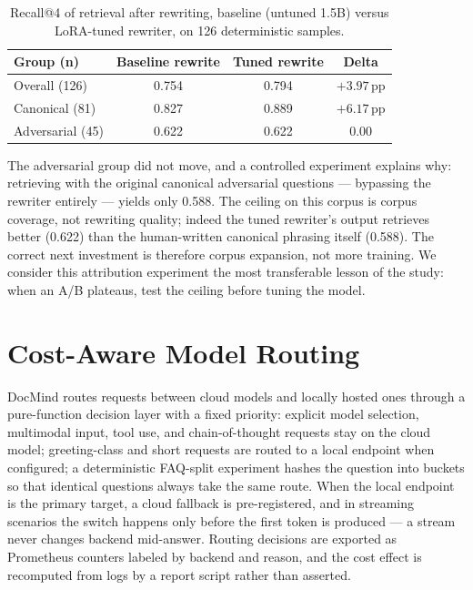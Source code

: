 \documentclass[11pt,a4paper]{article}
\begin{document}
\begin{table}[t]
  \centering
  \caption{Recall@4 of retrieval after rewriting, baseline (untuned 1.5B) versus
  LoRA-tuned rewriter, on 126 deterministic samples.}
  \label{tab:lora}
  \begin{tabular}{lccc}
    \toprule
    Group (n) & Baseline rewrite & Tuned rewrite & Delta \\
    \midrule
    Overall (126)    & 0.754 & 0.794 & $+3.97$\,pp \\
    Canonical (81)   & 0.827 & 0.889 & $+6.17$\,pp \\
    Adversarial (45) & 0.622 & 0.622 & $0.00$      \\
    \bottomrule
  \end{tabular}
\end{table}

The adversarial group did not move, and a controlled experiment explains why:
retrieving with the original canonical adversarial questions --- bypassing the rewriter
entirely --- yields only 0.588. The ceiling on this corpus is corpus coverage, not
rewriting quality; indeed the tuned rewriter's output retrieves better (0.622) than the
human-written canonical phrasing itself (0.588). The correct next investment is
therefore corpus expansion, not more training. We consider this attribution experiment
the most transferable lesson of the study: when an A/B plateaus, test the ceiling
before tuning the model.

\section{Cost-Aware Model Routing}\label{sec:routing}

DocMind routes requests between cloud models and locally hosted ones through a
pure-function decision layer with a fixed priority: explicit model selection,
multimodal input, tool use, and chain-of-thought requests stay on the cloud model;
greeting-class and short requests are routed to a local endpoint when configured; a
deterministic FAQ-split experiment hashes the question into buckets so that identical
questions always take the same route. When the local endpoint is the primary target, a
cloud fallback is pre-registered, and in streaming scenarios the switch happens only
before the first token is produced --- a stream never changes backend mid-answer.
Routing decisions are exported as Prometheus counters labeled by backend and reason,
and the cost effect is recomputed from logs by a report script rather than asserted.
\end{document}
